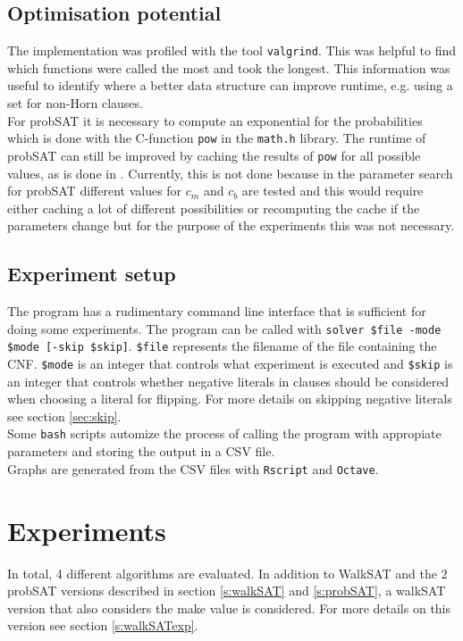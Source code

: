 \documentclass[12pt,a4paper]{article}
\begin{document}
\subsection{Optimisation potential}
The implementation was profiled with the tool \texttt{valgrind}. This was helpful to find which functions were called the most and took the longest. This information was useful to identify where a better data structure can improve runtime, e.g. using a set for non-Horn clauses. \\
For probSAT it is necessary to compute an exponential for the probabilities which is done with the C-function \texttt{pow} in the \texttt{math.h} library. The runtime of probSAT can still be improved by caching the results of \texttt{pow} for all possible values, as is done in \cite{probsat_impl}. Currently, this is not done because in the parameter search for probSAT different values for $c_{m}$ and $c_{b}$ are tested and this would require either caching a lot of different possibilities or recomputing the cache if the parameters change but for the purpose of the experiments this was not necessary.
\subsection{Experiment setup}
The program has a rudimentary command line interface that is sufficient for doing some experiments. The program can be called with \texttt{solver \$file -mode \$mode [-skip \$skip]}. \texttt{\$file} represents the filename of the file containing the CNF. \texttt{\$mode} is an integer that controls what experiment is executed and \texttt{\$skip} is an integer that controls whether negative literals in clauses should be considered when choosing a literal for flipping. For more details on skipping negative literals see section \ref{sec:skip}.\\
Some \texttt{bash} scripts automize the process of calling the program with appropiate parameters and storing the output in a CSV file. \\
Graphs are generated from the CSV files with \texttt{Rscript} and \texttt{Octave}.
\section{Experiments}
In total, 4 different algorithms are evaluated. In addition to WalkSAT and the 2 probSAT versions described in section \ref{s:walkSAT} and \ref{s:probSAT}, a walkSAT version that also considers the make value is considered. For more details on this version see section \ref{s:walkSATexp}.\\
\end{document}
